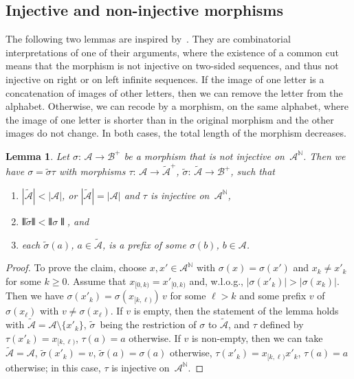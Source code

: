 \documentclass{amsart}
\newtheorem{lemma}{Lemma}[section]
\theoremstyle{definition}
\theoremstyle{remark}
\numberwithin{equation}{section}
\begin{document}
\subsection{Injective and non-injective morphisms}
The following two lemmas are inspired by~\cite[Case~(1) of the proof of Theorem~1]{Down:2008}.
They are combinatorial interpretations of one of their arguments, where the existence of a common cut means that the morphism is not injective on two-sided sequences, and thus not injective on right or on left infinite sequences. 
If the image of one letter is a concatenation of images of other letters, then we can remove the letter from the alphabet. 
Otherwise, we can recode by a morphism, on the same alphabet, where the image of one letter is shorter than in the original morphism and the other images do not change.
In both cases, the total length of the morphism decreases. 

\begin{lemma} \label{l:reducetotallength}
Let $\sigma:\, \mathcal{A} \to \mathcal{B}^+$ be a morphism that is not injective on~$\mathcal{A}^\mathbb{N}$.
Then we have $\sigma = \tilde{\sigma} \tau$ with morphisms $\tau:\, \mathcal{A} \to \tilde{\mathcal{A}}^+$, $\tilde{\sigma}:\, \tilde{\mathcal{A}} \to \mathcal{B}^+$, such that
\begin{enumerate}
\renewcommand{\theenumi}{\roman{enumi}}
\item
 $|\tilde{\mathcal{A}}| < |\mathcal{A}|$, or $|\tilde{\mathcal{A}}| = |\mathcal{A}|$ and $\tau$ is injective on~$\mathcal{A}^\mathbb{N}$, 
\item
$\interleave\tilde{\sigma}\interleave < \interleave\sigma\interleave$, and 
\item 
each $\tilde{\sigma}(a)$, $a \in \tilde{\mathcal{A}}$, is a prefix of some $\sigma(b)$, $b \in \mathcal{A}$. 
\end{enumerate}
\end{lemma}

\begin{proof}
To prove the claim, choose $x, x' \in \mathcal{A}^\mathbb{N}$ with $\sigma(x) = \sigma(x')$ and $x_k \ne x'_k$ for some $k \ge 0$.
Assume that $x_{[0,k)} = x'_{[0,k)}$ and, w.l.o.g., $|\sigma(x'_k)| > |\sigma(x_k)|$.
Then we have $\sigma(x'_k) = \sigma(x_{[k,\ell)})\, v$ for some $\ell > k$ and some prefix $v$ of $\sigma(x_\ell)$ with $v \ne \sigma(x_\ell)$. 
If $v$ is empty, then the statement of the lemma holds with $\tilde{\mathcal{A}} = \mathcal{A} \setminus \{x'_k\}$, $\tilde{\sigma}$~being the restriction of $\sigma$ to $\tilde{\mathcal{A}}$, and $\tau$ defined by $\tau(x'_k) = x_{[k,\ell)}$, $\tau(a) = a$ otherwise. 
If $v$ is non-empty, then we can take $\tilde{\mathcal{A}} = \mathcal{A}$, $\tilde{\sigma}(x'_k) = v$, $\tilde{\sigma}(a) = \sigma(a)$ otherwise, $\tau(x'_k) = x_{[k,\ell)} x'_k$, $\tau(a) = a$ otherwise; in this case, $\tau$ is injective on~$\mathcal{A}^\mathbb{N}$.
\end{proof}
\end{document}
